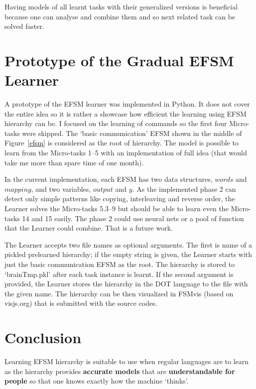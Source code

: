 \documentclass{article} %
\begin{document}
Having models of all learnt tasks with their generalized versions is beneficial 
because one can analyse and combine them and so
next related task can be solved faster.

\section{Prototype of the Gradual EFSM Learner}

A prototype of the EFSM learner was implemented in Python.
It does not cover the entire idea so it is rather a showcase how efficient the learning
using EFSM hierarchy can be.
I focused on the learning of commands so the first four Micro-tasks were skipped.
The `basic communication' EFSM shown in the middle of Figure~\ref{efsm}
is considered as the root of hierarchy.
The model is possible to learn from the Micro-tasks 1--5 with an implementation of full idea
(that would take me more than spare time of one month).

In the current implementation, each EFSM has two data structures, $words$ and $mapping$, and two variables, $output$ and $y$.
As the implemented phase 2 can detect only simple patterns like copying, interleaving and reverse order,
the Learner solves the Micro-tasks 5.3--9 but should be able to learn even the Micro-tasks 14 and 15 easily.
The phase 2 could use neural nets or a pool of function that the Learner could combine. That is a future work.

The Learner accepts two file names as optional arguments. The first is name of a pickled prelearned hierarchy;
if the empty string is given, the Learner starts with just the basic communication EFSM as the root.
The hierarchy is stored to `brainTmp.pkl' after each task instance is learnt.
If the second argument is provided, the Learner stores the hierarchy in the DOT language to the file with the given name.
The hierarchy can be then visualized in FSMvis (based on visjs.org) that is submitted with the source codes.

\section{Conclusion}

Learning EFSM hierarchy is suitable to use when regular languages are to learn
as the hierarchy provides {\bf accurate models} that are {\bf understandable for people}
so that one knows exactly how the machine `thinks'.
\end{document}
